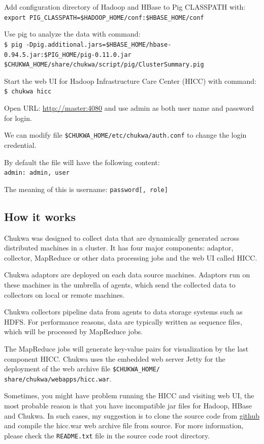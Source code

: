 Add configuration directory of Hadoop and HBase to Pig CLASSPATH with: \\
\verb|export PIG_CLASSPATH=$HADOOP_HOME/conf:$HBASE_HOME/conf|

Use pig to analyze the data with command: \\
\verb|$ pig -Dpig.additional.jars=$HBASE_HOME/hbase-0.94.5.jar:$PIG_HOME/pig-0.11.0.jar $CHUKWA_HOME/share/chukwa/script/pig/ClusterSummary.pig |

Start the web UI for Hadoop Infrastructure Care Center (HICC) with command: \\
\verb|$ chukwa hicc|

Open URL: \url{http://master:4080} and use admin as both user name and password for login.

We can modify file \verb|$CHUKWA_HOME/etc/chukwa/auth.conf| to change the login credential.

By default the file will have the following content:\\
\verb|admin: admin, user|

The meaning of this is username: \verb|password[, role]|

\subsection*{How it works}
Chukwa was designed to collect data that are dynamically generated across distributed machines in a cluster. It has four major components: adaptor, collector, MapReduce or other data processing jobs and the web UI called HICC.

Chukwa adaptors are deployed on each data source machines. Adaptors run on these machines in the umbrella of agents, which send the collected data to collectors on local or remote machines.

Chukwa collectors pipeline data from agents to data storage systems such as HDFS. For performance reasons, data are typically written as sequence files, which will be processed by MapReduce jobs.

The MapReduce jobs will generate key-value pairs for visualization by the last component HICC. Chukwa uses the embedded web server Jetty for the deployment of the web archive file \verb|$CHUKWA_HOME/ share/chukwa/webapps/hicc.war|.

Sometimes, you might have problem running the HICC and visiting web UI, the most probable reason is that you have incompatible jar files for Hadoop, HBase and Chukwa. In such cases, my suggestion is to clone the source code from \href{https://github.com/apache/chukwa}{github} and compile the hicc.war web archive file from source. For more information, please check the \verb|README.txt| file in the source code root directory.

